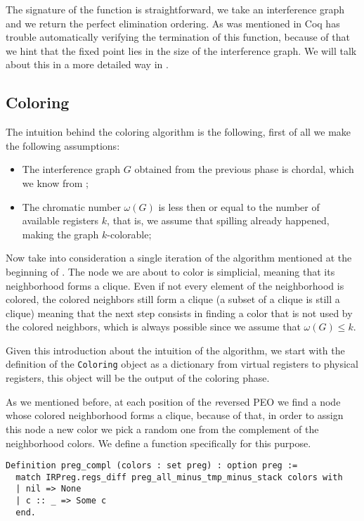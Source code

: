 The signature of the function is straightforward, we take an interference graph and we return the perfect elimination ordering.
As was mentioned in  Coq has trouble automatically verifying the termination of this function, because of that we hint that the fixed point lies in the size of the interference graph. We will talk about this in a more detailed way in .

\subsection{Coloring}
\label{subsec:coloring}

The intuition behind the coloring algorithm is the following, first of all we make the following assumptions:

\begin{itemize}
  \item The interference graph $G$ obtained from the previous phase is chordal, which we know from ;
  \item The chromatic number $\omega(G)$ is less then or equal to the number of available registers $k$, that is, we assume that spilling already happened, making the graph $k$-colorable;
\end{itemize}

Now take into consideration a single iteration of the algorithm mentioned at the beginning of . The node we are about to color is simplicial, meaning that its neighborhood forms a clique. Even if not every element of the neighborhood is colored, the colored neighbors still form a clique (a subset of a clique is still a clique) meaning that the next step consists in finding a color that is not used by the colored neighbors, which is always possible since we assume that $\omega(G) \leq k$.

Given this introduction about the intuition of the algorithm, we start with the definition of the \texttt{Coloring} object as a dictionary from virtual registers to physical registers, this object will be the output of the coloring phase.

As we mentioned before, at each position of the \textit reversed PEO we find a node whose colored neighborhood forms a clique, because of that, in order to assign this node a new color we pick a random one from the complement of the neighborhood colors. We define a function specifically for this purpose.

\begin{lstlisting}[style=Coq]
Definition preg_compl (colors : set preg) : option preg :=
  match IRPreg.regs_diff preg_all_minus_tmp_minus_stack colors with
  | nil => None
  | c :: _ => Some c
  end.
\end{lstlisting}

